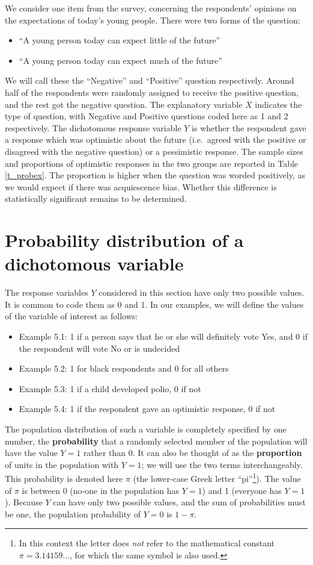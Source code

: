 We consider one item from the survey, concerning the respondents'
opinions on the expectations of today's young people. There were two
forms of the question:
\begin{itemize}
\item
``A young person today can expect little of the future''
\item
``A young person today can expect much of the future''
\end{itemize}
We will call these the ``Negative'' and ``Positive'' question
respectively.
Around half of the respondents were randomly assigned to receive the
positive question, and the rest got the negative question.
The explanatory variable $X$ indicates the type of question,
with Negative and Positive questions coded here as 1 and 2
respectively. The dichotomous response variable $Y$
is whether the
respondent gave a response which was optimistic about the future
(i.e.\ agreed with the positive or disagreed with the negative
question) or a pessimistic response.
The sample sizes and proportions
of optimistic responses in the two
groups are reported in Table \ref{t_probex}. The proportion is higher when the question was worded positively, as we
would expect if there was acquiescence bias. Whether this difference is
statistically significant remains to be determined.

\section{Probability distribution of a dichotomous variable}
\label{s_probs_distribution}

The response variables $Y$ considered in this section have only  two
possible values. It is common to code them as 0 and 1. In our examples, we will
define the values of the variable of interest as follows:
\begin{itemize}
\item
Example 5.1: 1 if a person says that he or she will
definitely vote Yes, and 0 if the respondent will vote No or is
undecided
\item
Example 5.2: 1 for black respondents and 0 for all others
\item
Example 5.3: 1 if a child developed polio, 0 if not
\item
Example 5.4: 1 if the respondent gave an optimistic response, 0 if not
\end{itemize}
The population distribution of such a variable is completely specified
by one number, the \textbf{probability} that a randomly selected member
of the population will have the value $Y=1$ rather than 0.
It can also be thought of as the \textbf{proportion} of units
in the population with $Y=1$; we will
use the two terms interchangeably.
This probability is denoted here $\pi$ (the lower-case Greek letter ``pi''\footnote{In this
context the letter does \emph{not} refer to the mathematical constant
$\pi=3.14159\dots$, for which the same symbol is also used.}). The value
of $\pi$ is between 0 (no-one in the population has $Y=1$) and 1
(everyone has $Y=1$). Because $Y$ can have only two possible values, and
the sum of probabilities must be one, the population probability of $Y=0$
is $1-\pi$.

